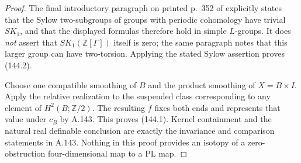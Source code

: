 \begin{proof}
The final introductory paragraph on printed p.~352 of
\cite{HambletonMilgramTaylorWilliams1988} explicitly states that the
Sylow two-subgroups of groups with periodic cohomology have trivial
$SK_1$, and that the displayed formulas therefore hold in simple
$L$-groups. It does \emph{not} assert that $SK_1(\mathbb Z[\Gamma])$
itself is zero; the same paragraph notes that this larger group can
have two-torsion. Applying the stated Sylow assertion proves (144.2).

Choose one compatible smoothing of $B$ and the product smoothing of
$X=B\times I$. Apply the relative realization to the suspended class
corresponding to any element of $H^2(B;\mathbb Z/2)$. The resulting
$f$ fixes both ends and represents that value under $c_B$ by A.143.
This proves (144.1). Kernel containment and the natural real
definable conclusion are exactly the invariance and comparison
statements in A.143. Nothing in this proof provides an isotopy of
a zero-obstruction four-dimensional map to a PL map.
\end{proof}

